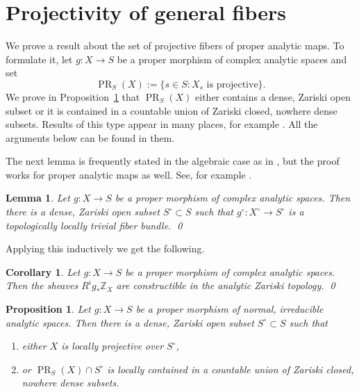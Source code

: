 \documentclass{amsart}
\newtheorem{lem}[thm]{Lemma}
\newtheorem{cor}[thm]{Corollary}
\newtheorem{prop}[thm]{Proposition}
\theoremstyle{definition}
\theoremstyle{remark}
\newcommand{\z}[0]{{\mathbb Z}}
\begin{document}
\section{Projectivity of general fibers}
  

We prove a  result about the set of projective fibers of  proper analytic maps.
 To formulate it, let $g:X\to S$ be a  proper morphism of complex analytic spaces and  set
  $$
  \operatorname{PR}_S(X):=\{s\in S:  X_s \mbox{ is projective}\}.
  $$
  We prove in Proposition~\ref{RT.vb.Zd.M} that
  $\operatorname{PR}_S(X) $  either contains  a dense, Zariski open subset or
  it is contained in a  countable union of
  Zariski closed, nowhere dense subsets.
Results of this type appear in many places,  for example
  \cite{iitaka, lie-ser, ueno-83, rao-tsa-1, rao-tsa}. All the arguments below can be found in  them.


The next lemma is frequently stated in the algebraic case as in 
\cite[p.43]{gm-book}, but the proof works for proper analytic maps as well. See, for example 
\cite[p.10]{parusinski}. 

\begin{lem}\label{top.of.prop.maps.1}
Let $g:X\to S$ be a  proper morphism of complex analytic spaces.
Then there is a dense,  Zariski open subset $S^\circ\subset S$ such that
$g^\circ:X^\circ\to S^\circ$ is a topologically locally trivial fiber bundle. 
\qed
\end{lem}

Applying  this inductively we get the following.

\begin{cor}\label{top.of.prop.maps.2}
  Let $g:X\to S$ be a  proper morphism of complex analytic spaces.
  Then the sheaves $R^ig_*\z_X$ are constructible in the analytic Zariski topology. \qed
\end{cor}
 


 

 
  
  \begin{prop} \label{RT.vb.Zd.M} Let $g:X\to S$ be a  proper morphism of   normal, irreducible  analytic spaces.  
Then  there is  a dense, Zariski open subset  $S^\circ\subset S$  such that
\begin{enumerate}
\item either   $X$ is locally projective over $S^\circ$,
  \item or $\operatorname{PR}_{S}(X)\cap S^\circ$ is locally contained in a countable union of  Zariski closed, nowhere dense subsets.
\end{enumerate}
  \end{prop}
\end{document}
